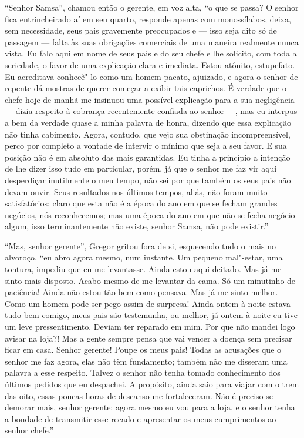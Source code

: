 “Senhor Samsa”, chamou então o gerente, em voz alta, “o que se passa? O
senhor fica entrincheirado aí em seu quarto, responde apenas com
monossílabos, deixa, sem necessidade, seus pais gravemente preocupados e ---
isso seja dito só de passagem --- falta às suas obrigações comerciais de uma
maneira realmente nunca vista. Eu falo aqui em nome de seus pais e do seu
chefe e lhe solicito, com toda a seriedade, o favor de uma explicação
clara e imediata. Estou atônito, estupefato. Eu acreditava conhecê"-lo como
um homem pacato, ajuizado, e agora o senhor de repente dá mostras de
querer começar a exibir tais caprichos. É verdade que o chefe hoje de
manhã me insinuou uma possível explicação para a sua negligência --- dizia
respeito à cobrança recentemente confiada ao senhor ---, mas eu interpus a
bem da verdade quase a minha palavra de honra, dizendo que essa explicação
não tinha cabimento. Agora, contudo, que vejo sua obstinação
incompreensível, perco por completo a vontade de intervir o mínimo que
seja a seu favor. E sua posição não é em absoluto das mais garantidas. Eu
tinha a princípio a intenção de lhe dizer isso tudo em particular, porém,
já que o senhor me faz vir aqui desperdiçar inutilmente o meu tempo, não
sei por que também os seus pais não devam ouvir. Seus resultados nos
últimos tempos, aliás, não foram muito satisfatórios; claro que esta não é
a época do ano em que se fecham grandes negócios, nós reconhecemos; mas
uma época do ano em que não se fecha negócio algum, isso terminantemente
não existe, senhor Samsa, não pode existir.”

“Mas, senhor gerente”, Gregor gritou fora de si, esquecendo tudo o mais no
alvoroço, “eu abro agora mesmo, num instante. Um pequeno mal"-estar, uma
tontura, impediu que eu me levantasse. Ainda estou aqui deitado. Mas já me
sinto mais disposto. Acabo mesmo de me levantar da cama. Só um minutinho
de paciência! Ainda não estou tão bem como pensava. Mas já me sinto
melhor. Como um homem pode ser pego assim de surpresa! Ainda ontem à noite
estava tudo bem comigo, meus pais são testemunha, ou melhor, já ontem à
noite eu tive um leve pressentimento. Deviam ter reparado em mim. Por que
não mandei logo avisar na loja?! Mas a gente sempre pensa que vai vencer a
doença sem precisar ficar em casa. Senhor gerente! Poupe os meus pais!
Todas as acusações que o senhor me faz agora, elas não têm fundamento;
também não me disseram uma palavra a esse respeito. Talvez o senhor não
tenha tomado conhecimento dos últimos pedidos que eu despachei. A
propósito, ainda saio para viajar com o trem das oito, essas poucas horas
de descanso me fortaleceram. Não é preciso se demorar mais, senhor
gerente; agora mesmo eu vou para a loja, e o senhor tenha a bondade de
transmitir esse recado e apresentar os meus cumprimentos ao senhor chefe.”

